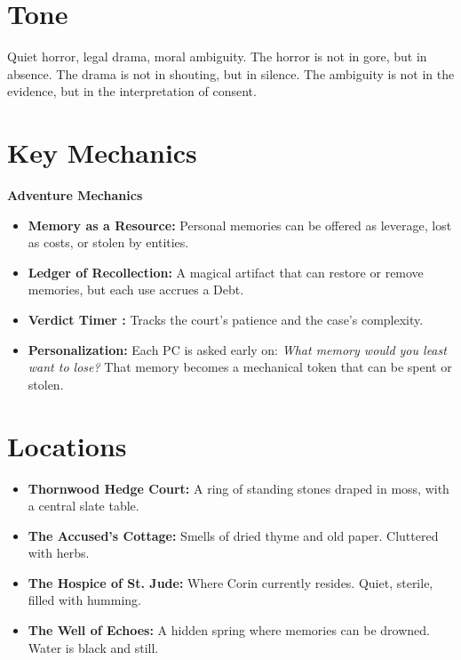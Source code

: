 \documentclass[12pt]{book}
\begin{document}
\section{Tone}

Quiet horror, legal drama, moral ambiguity. The horror is not in gore, but in absence. The drama is not in shouting, but in silence. The ambiguity is not in the evidence, but in the interpretation of consent.

\section{Key Mechanics}

\begin{infobox}
\textbf{Adventure Mechanics}
\begin{itemize}
    \item \textbf{Memory as a Resource:} Personal memories can be offered as leverage, lost as costs, or stolen by entities.
    \item \textbf{Ledger of Recollection:} A magical artifact that can restore or remove memories, but each use accrues a Debt.
    \item \textbf{Verdict Timer :} Tracks the court's patience and the case's complexity.
    \item \textbf{Personalization:} Each PC is asked early on: \textit{What memory would you least want to lose?} That memory becomes a mechanical token that can be spent or stolen.
\end{itemize}
\end{infobox}

\section{Locations}

\begin{itemize}
    \item \textbf{Thornwood Hedge Court:} A ring of standing stones draped in moss, with a central slate table.
    \item \textbf{The Accused's Cottage:} Smells of dried thyme and old paper. Cluttered with herbs.
    \item \textbf{The Hospice of St. Jude:} Where Corin currently resides. Quiet, sterile, filled with humming.
    \item \textbf{The Well of Echoes:} A hidden spring where memories can be drowned. Water is black and still.
\end{itemize}
\end{document}
